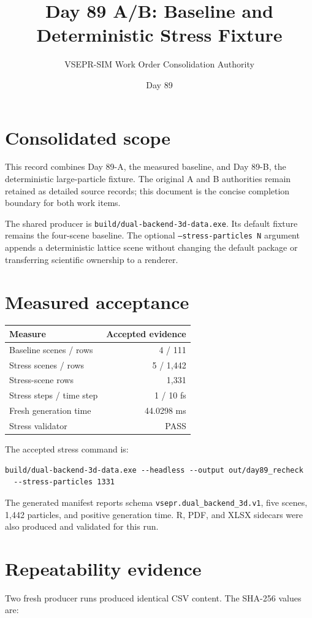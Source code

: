 \documentclass[11pt]{article}
\title{Day 89 A/B: Baseline and Deterministic Stress Fixture}
\author{VSEPR-SIM Work Order Consolidation Authority}
\date{Day 89}
\begin{document}
\maketitle

\section*{Consolidated scope}
This record combines Day 89-A, the measured baseline, and Day 89-B, the deterministic large-particle fixture. The original A and B authorities remain retained as detailed source records; this document is the concise completion boundary for both work items.

The shared producer is \texttt{build/dual-backend-3d-data.exe}. Its default fixture remains the four-scene baseline. The optional \texttt{--stress-particles N} argument appends a deterministic lattice scene without changing the default package or transferring scientific ownership to a renderer.

\section*{Measured acceptance}
\begin{center}
\begin{tabular}{lr}
\toprule
Measure & Accepted evidence \\
\midrule
Baseline scenes / rows & 4 / 111 \\
Stress scenes / rows & 5 / 1,442 \\
Stress-scene rows & 1,331 \\
Stress steps / time step & 1 / 10 fs \\
Fresh generation time & 44.0298 ms \\
Stress validator & PASS \\
\bottomrule
\end{tabular}
\end{center}

The accepted stress command is:
\begin{verbatim}
build/dual-backend-3d-data.exe --headless --output out/day89_recheck
  --stress-particles 1331
\end{verbatim}
The generated manifest reports schema \texttt{vsepr.dual\_backend\_3d.v1}, five scenes, 1,442 particles, and positive generation time. R, PDF, and XLSX sidecars were also produced and validated for this run.

\newpage
\section*{Repeatability evidence}
Two fresh producer runs produced identical CSV content. The SHA-256 values are:
\end{document}
